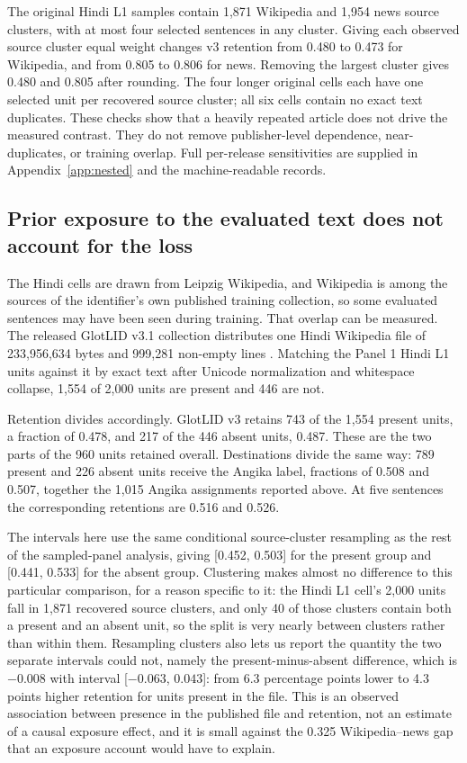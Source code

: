 \documentclass[final]{clv2025}
\begin{document}
The original Hindi L1 samples contain 1,871 Wikipedia and 1,954 news source clusters, with at most four selected sentences in any cluster. Giving each observed source cluster equal weight changes v3 retention from 0.480 to 0.473 for Wikipedia, and from 0.805 to 0.806 for news. Removing the largest cluster gives 0.480 and 0.805 after rounding. The four longer original cells each have one selected unit per recovered source cluster; all six cells contain no exact text duplicates. These checks show that a heavily repeated article does not drive the measured contrast. They do not remove publisher-level dependence, near-duplicates, or training overlap. Full per-release sensitivities are supplied in Appendix~\ref{app:nested} and the machine-readable records.
\subsection{Prior exposure to the evaluated text does not account for the loss}\label{sec:overlap}

The Hindi cells are drawn from Leipzig Wikipedia, and Wikipedia is among the sources of the identifier's own published training collection, so some evaluated sentences may have been seen during training. That overlap can be measured. The released GlotLID v3.1 collection distributes one Hindi Wikipedia file of 233{,}956{,}634 bytes and 999{,}281 non-empty lines \citep{glotlid-corpus-v31}. Matching the Panel 1 Hindi L1 units against it by exact text after Unicode normalization and whitespace collapse, 1{,}554 of 2{,}000 units are present and 446 are not.

Retention divides accordingly. GlotLID v3 retains 743 of the 1{,}554 present units, a fraction of 0.478, and 217 of the 446 absent units, 0.487. These are the two parts of the 960 units retained overall. Destinations divide the same way: 789 present and 226 absent units receive the Angika label, fractions of 0.508 and 0.507, together the 1{,}015 Angika assignments reported above. At five sentences the corresponding retentions are 0.516 and 0.526.

The intervals here use the same conditional source-cluster resampling as the rest of the sampled-panel analysis, giving [0.452, 0.503] for the present group and [0.441, 0.533] for the absent group. Clustering makes almost no difference to this particular comparison, for a reason specific to it: the Hindi L1 cell's 2,000 units fall in 1,871 recovered source clusters, and only 40 of those clusters contain both a present and an absent unit, so the split is very nearly between clusters rather than within them. Resampling clusters also lets us report the quantity the two separate intervals could not, namely the present-minus-absent difference, which is $-0.008$ with interval [$-0.063$, $0.043$]: from 6.3 percentage points lower to 4.3 points higher retention for units present in the file. This is an observed association between presence in the published file and retention, not an estimate of a causal exposure effect, and it is small against the 0.325 Wikipedia--news gap that an exposure account would have to explain.
\end{document}
